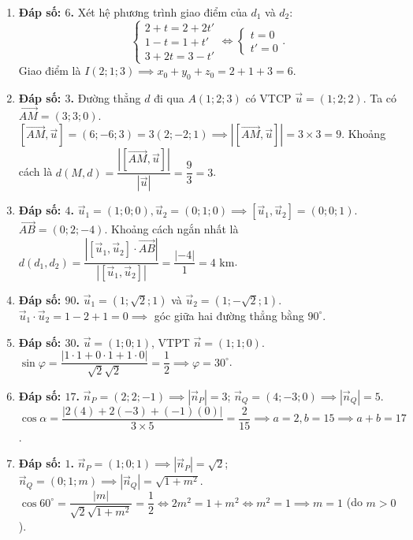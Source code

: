\documentclass[12pt,a4paper]{article}
\begin{document}
\begin{enumerate}
\item \textbf{Đáp số: $6$.}  
Xét hệ phương trình giao điểm của $d_1$ và $d_2$:
\[
\begin{cases} 2 + t = 2 + 2t' \\ 1 - t = 1 + t' \\ 3 + 2t = 3 - t' \end{cases} \iff \begin{cases} t = 0 \\ t' = 0 \end{cases}.
\]
Giao điểm là $I(2; 1; 3) \implies x_0 + y_0 + z_0 = 2 + 1 + 3 = 6$.

\item \textbf{Đáp số: $3$.}  
Đường thẳng $d$ đi qua $A(1; 2; 3)$ có VTCP $\vec{u} = (1; 2; 2)$. Ta có $\vec{AM} = (3; 3; 0)$.  
$[\vec{AM}, \vec{u}] = (6; -6; 3) = 3(2; -2; 1) \implies |[\vec{AM}, \vec{u}]| = 3 \times 3 = 9$.  
Khoảng cách là $d(M, d) = \dfrac{|[\vec{AM}, \vec{u}]|}{|\vec{u}|} = \dfrac{9}{3} = 3$.

\item \textbf{Đáp số: $4$.}  
$\vec{u}_1 = (1; 0; 0), \vec{u}_2 = (0; 1; 0) \implies [\vec{u}_1, \vec{u}_2] = (0; 0; 1)$.  
$\vec{AB} = (0; 2; -4)$.  
Khoảng cách ngắn nhất là $d(d_1, d_2) = \dfrac{|[\vec{u}_1, \vec{u}_2] \cdot \vec{AB}|}{|[\vec{u}_1, \vec{u}_2]|} = \dfrac{|-4|}{1} = 4\text{ km}$.

\item \textbf{Đáp số: $90$.}  
$\vec{u}_1 = (1; \sqrt{2}; 1)$ và $\vec{u}_2 = (1; -\sqrt{2}; 1)$.  
$\vec{u}_1 \cdot \vec{u}_2 = 1 - 2 + 1 = 0 \implies$ góc giữa hai đường thẳng bằng $90^\circ$.

\item \textbf{Đáp số: $30$.}  
$\vec{u} = (1; 0; 1)$, VTPT $\vec{n} = (1; 1; 0)$.  
$\sin\varphi = \dfrac{|1\cdot 1 + 0\cdot 1 + 1\cdot 0|}{\sqrt{2}\sqrt{2}} = \dfrac{1}{2} \implies \varphi = 30^\circ$.

\item \textbf{Đáp số: $17$.}  
$\vec{n}_P = (2; 2; -1) \implies |\vec{n}_P| = 3$; $\vec{n}_Q = (4; -3; 0) \implies |\vec{n}_Q| = 5$.  
$\cos\alpha = \dfrac{|2(4) + 2(-3) + (-1)(0)|}{3 \times 5} = \dfrac{2}{15} \implies a = 2, b = 15 \implies a + b = 17$.

\item \textbf{Đáp số: $1$.}  
$\vec{n}_P = (1; 0; 1) \implies |\vec{n}_P| = \sqrt{2}$; $\vec{n}_Q = (0; 1; m) \implies |\vec{n}_Q| = \sqrt{1 + m^2}$.  
$\cos 60^\circ = \dfrac{|m|}{\sqrt{2}\sqrt{1 + m^2}} = \dfrac{1}{2} \iff 2m^2 = 1 + m^2 \iff m^2 = 1 \implies m = 1$ (do $m > 0$).


\end{enumerate}
\end{document}
